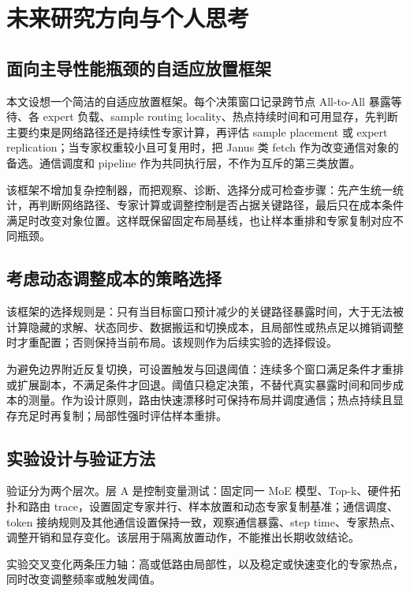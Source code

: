 \section{未来研究方向与个人思考}
\label{sec:future}

\subsection{面向主导性能瓶颈的自适应放置框架}

本文设想一个简洁的自适应放置框架。每个决策窗口记录跨节点 All-to-All 暴露等待、各 expert 负载、sample routing locality、热点持续时间和可用显存，先判断主要约束是网络路径还是持续性专家计算，再评估 sample placement 或 expert replication；当专家权重较小且可复用时，把 Janus 类 fetch 作为改变通信对象的备选。通信调度和 pipeline 作为共同执行层，不作为互斥的第三类放置。

该框架不增加复杂控制器，而把观察、诊断、选择分成可检查步骤：先产生统一统计，再判断网络路径、专家计算或调整控制是否占据关键路径，最后只在成本条件满足时改变对象位置。这样既保留固定布局基线，也让样本重排和专家复制对应不同瓶颈。

\subsection{考虑动态调整成本的策略选择}

该框架的选择规则是：只有当目标窗口预计减少的关键路径暴露时间，大于无法被计算隐藏的求解、状态同步、数据搬运和切换成本，且局部性或热点足以摊销调整时才重配置；否则保持当前布局。该规则作为后续实验的选择假设。

为避免边界附近反复切换，可设置触发与回退阈值：连续多个窗口满足条件才重排或扩展副本，不满足条件才回退。阈值只稳定决策，不替代真实暴露时间和同步成本的测量。作为设计原则，路由快速漂移时可保持布局并调度通信；热点持续且显存充足时再复制；局部性强时评估样本重排。

\subsection{实验设计与验证方法}

验证分为两个层次。层 A 是控制变量测试：固定同一 MoE 模型、Top-k、硬件拓扑和路由 trace，设置固定专家并行、样本放置和动态专家复制基准；通信调度、token 接纳规则及其他通信设置保持一致，观察通信暴露、step time、专家热点、调整开销和显存变化。该层用于隔离放置动作，不能推出长期收敛结论。

实验交叉变化两条压力轴：高或低路由局部性，以及稳定或快速变化的专家热点，同时改变调整频率或触发阈值。

